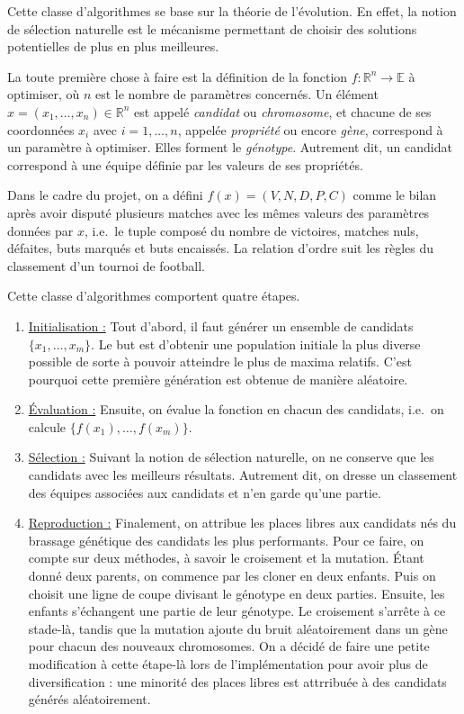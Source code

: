 \documentclass[12pt,a4paper]{article}
\begin{document}
Cette classe d'algorithmes se base sur la th\'eorie de l'\'evolution. En effet, 
la notion de s\'election naturelle est le m\'ecanisme permettant de choisir des 
solutions potentielles de plus en plus meilleures.

La toute premi\`ere chose \`a faire est la d\'efinition de la fonction 
$f: \mathbb{R}^n \to \mathbb{E}$ \`a optimiser, o\`u $n$ est le nombre de 
param\`etres concern\'es. Un \'el\'ement $x=(x_1,\dotsc,x_n) \in \mathbb{R}^n$ 
est appel\'e {\itshape candidat} ou {\itshape chromosome}, et chacune de ses 
coordonn\'ees $x_i$ avec $i=1,\dotsc,n$, appel\'ee {\itshape propri\'et\'e} 
ou encore {\itshape g\`ene}, correspond \`a un param\`etre \`a optimiser. Elles 
forment le {\itshape g\'enotype}.
Autrement dit, un candidat correspond \`a une \'equipe d\'efinie par les valeurs
de ses propri\'et\'es.

Dans le cadre du projet, on a d\'efini $f(x)=(V,N,D,P,C)$ comme le 
bilan apr\`es avoir disput\'e plusieurs matches avec les m\^emes valeurs des 
param\`etres donn\'ees par $x$, i.e.\ le tuple compos\'e du 
nombre de 
victoires, matches nuls, d\'efaites, buts marqu\'es et buts encaiss\'es. La 
relation d'ordre suit les r\`egles du classement d'un tournoi de football.

Cette classe d'algorithmes comportent quatre \'etapes.

\begin{enumerate}
\item \underline{Initialisation :} Tout d'abord, il faut g\'en\'erer un 
ensemble de candidats $\{x_1,\dotsc,x_m\}$. Le but est d'obtenir une population 
initiale la plus diverse possible de sorte \`a pouvoir atteindre le plus de 
maxima relatifs. C'est pourquoi cette premi\`ere g\'en\'eration est obtenue de 
mani\`ere al\'eatoire.
\item \underline{\'Evaluation :} Ensuite, on \'evalue la fonction en 
chacun des candidats, i.e.\ on calcule $\{f(x_1),\dotsc,f(x_m)\}$.
\item \underline{S\'election :} Suivant la notion de s\'election 
naturelle, on ne conserve que les candidats avec les meilleurs r\'esultats. 
Autrement dit, on dresse un classement des \'equipes associ\'ees aux candidats 
et n'en garde qu'une partie.
\item \underline{Reproduction :} Finalement, on attribue les places 
libres aux candidats n\'es du brassage g\'en\'etique des candidats les 
plus performants. Pour ce faire, on compte sur deux m\'ethodes, \`a savoir le 
croisement et la mutation. \'Etant donn\'e deux parents, on commence par les 
cloner en deux enfants. Puis on choisit une ligne de coupe divisant le 
g\'enotype en deux parties. Ensuite, les enfants s'\'echangent une partie de 
leur g\'enotype. Le croisement s'arr\^ete \`a ce stade-l\`a, tandis que la 
mutation ajoute du bruit al\'eatoirement dans un g\`ene pour chacun 
des nouveaux chromosomes. On a d\'ecid\'e de faire une petite modification \`a 
cette \'etape-l\`a lors de l'impl\'ementation pour avoir plus de 
diversification : une minorit\'e des places libres est attrribu\'ee \`a des 
candidats g\'en\'er\'es al\'eatoirement.
\end{enumerate}
\end{document}
